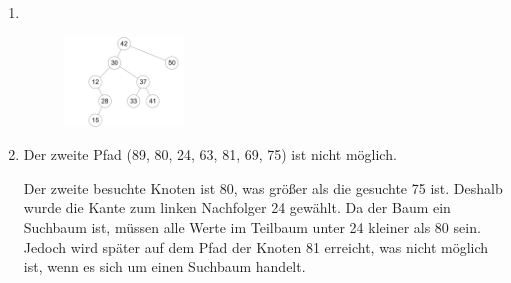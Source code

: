 \documentclass[11pt,a4paper]{article}
\begin{document}
\begin{loesung}
    \begin{enumerate}
        \item \ \\
        \begin{figure}[h!]
            \centering
            \includegraphics[width=0.3\textwidth]{img/2a}
        \end{figure}
        \FloatBarrier

        \item Der zweite Pfad (89, 80, 24, 63, 81, 69, 75) ist nicht möglich.

        Der zweite besuchte Knoten ist 80, was größer als die gesuchte 75 ist.
        Deshalb wurde die Kante zum linken Nachfolger 24 gewählt.
        Da der Baum ein Suchbaum ist, müssen alle Werte im Teilbaum unter 24 kleiner als 80 sein.
        Jedoch wird später auf dem Pfad der Knoten 81 erreicht, was nicht möglich ist, wenn es sich um einen Suchbaum handelt.
        

\end{enumerate}
\end{loesung}
\end{document}
